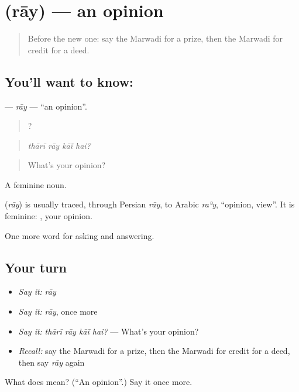 \section[\texorpdfstring{\mw{राय} (rāy)}{राय (rāy)}]{ (rāy) — an opinion}

\label{lesson:MW-C275-ray}



\begin{quote}
Before the new one: say the Marwadi for a prize, then the Marwadi for credit for a deed.
\end{quote}

\subsection*{You'll want to know: }
\textbf{} — \emph{rāy} — \textquotedblleft{}an opinion\textquotedblright{}.

\begin{quote}
   ?
\end{quote}

\begin{quote}
\emph{thārī rāy kāĩ hai?}
\end{quote}

\begin{quote}
What's your opinion?
\end{quote}

A feminine noun.

\begin{cousinweb}
\textbf{} (\emph{rāy}) is usually traced, through Persian \emph{rāy}, to Arabic \emph{raʾy}, \textquotedblleft{}opinion, view\textquotedblright{}. It is feminine: \textbf{ }, your opinion.
\end{cousinweb}

\begin{grammarlens}[title={What you've built}]
One more word for asking and answering.
\end{grammarlens}

\subsection*{Your turn}
\begin{itemize}
\raggedright
  \item \emph{Say it:} \emph{rāy}
  \item \emph{Say it:} \emph{rāy}, once more
  \item \emph{Say it:} \emph{thārī rāy kāĩ hai?} — What's your opinion?
  \item \emph{Recall:} say the Marwadi for a prize, then the Marwadi for credit for a deed, then say \emph{rāy} again
\end{itemize}

\begin{tcolorbox}[breakable,colback=teal!4,colframe=teal!35!black,title={Before you move on}]
What does  mean? (\textquotedblleft{}An opinion\textquotedblright{}.) Say it once more.
\end{tcolorbox}
